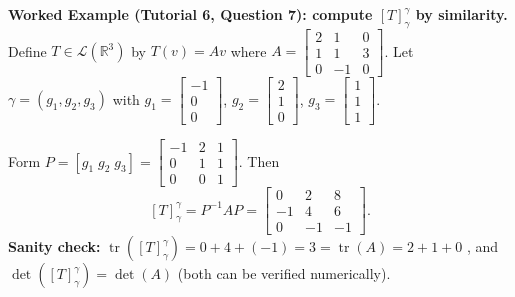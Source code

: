 \begin{examplebox}
\textbf{Worked Example (Tutorial 6, Question 7): compute $[T]^{\gamma}_{\gamma}$ by similarity.}
Define $T\in\mathcal{L}(\mathbb{R}^3)$ by $T(v)=Av$ where
$A=\begin{bmatrix}2&1&0\\1&1&3\\0&-1&0\end{bmatrix}$.
Let $\gamma=(g_1,g_2,g_3)$ with
$g_1=\begin{bmatrix}-1\\0\\0\end{bmatrix}$, $g_2=\begin{bmatrix}2\\1\\0\end{bmatrix}$, $g_3=\begin{bmatrix}1\\1\\1\end{bmatrix}$.

Form $P=[g_1\; g_2\; g_3]=\begin{bmatrix}-1&2&1\\0&1&1\\0&0&1\end{bmatrix}$. Then
\[
[T]^{\gamma}_{\gamma}=P^{-1}AP=\begin{bmatrix}0&2&8\\-1&4&6\\0&-1&-1\end{bmatrix}.
\]
\textbf{Sanity check:} $\operatorname{tr}([T]^{\gamma}_{\gamma})=0+4+(-1)=3=\operatorname{tr}(A)=2+1+0$ \checkmark, and $\det([T]^{\gamma}_{\gamma})=\det(A)$ (both can be verified numerically).
\end{examplebox}


